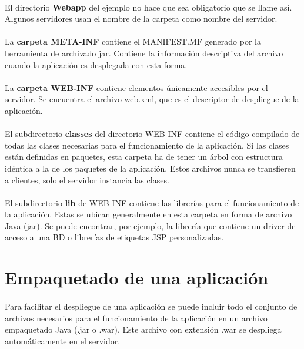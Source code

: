 \documentclass{article}
\begin{document}
	\paragraph{}El directorio \textbf{Webapp} del ejemplo no hace que sea obligatorio que se llame así. Algunos servidores usan el nombre de la carpeta como nombre del servidor.
	
	\paragraph{}La \textbf{carpeta META-INF} contiene el MANIFEST.MF generado por la herramienta de archivado jar. Contiene la información descriptiva del archivo cuando la aplicación es desplegada con esta forma.
	
	\paragraph{}La \textbf{carpeta WEB-INF} contiene elementos únicamente accesibles por el servidor. Se encuentra el archivo web.xml, que es el descriptor de despliegue de la aplicación.
	
	\paragraph{}El subdirectorio \textbf{classes} del directorio WEB-INF contiene el código compilado de todas las clases necesarias para el funcionamiento de la aplicación. Si las clases están definidas en paquetes, esta carpeta ha de tener un árbol con estructura idéntica a la de los paquetes de la aplicación. Estos archivos nunca se transfieren a clientes, solo el servidor instancia las clases.
	
	\paragraph{}El subdirectorio \textbf{lib} de WEB-INF contiene las librerías para el funcionamiento de la aplicación. Estas se ubican generalmente en esta carpeta en forma de archivo Java (jar). Se puede encontrar, por ejemplo, la librería que contiene un driver de acceso a una BD o librerías de etiquetas JSP personalizadas.
	
	\section{Empaquetado de una aplicación}
	
	\paragraph{}Para facilitar el despliegue de una aplicación se puede incluir todo el conjunto de archivos necesarios para el funcionamiento de la aplicación en un archivo empaquetado Java (.jar o .war). Este archivo con extensión .war se despliega automáticamente en el servidor.
	
\end{document}
